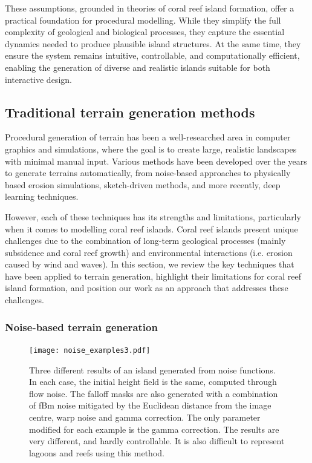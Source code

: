 These assumptions, grounded in theories of coral reef island formation, offer a practical foundation for procedural modelling. While they simplify the full complexity of geological and biological processes, they capture the essential dynamics needed to produce plausible island structures. At the same time, they ensure the system remains intuitive, controllable, and computationally efficient, enabling the generation of diverse and realistic islands suitable for both interactive design.





\subsection{Traditional terrain generation methods}
\label{sec:coral-island-sota-traditional}

Procedural generation of terrain has been a well-researched area in computer graphics and simulations, where the goal is to create large, realistic landscapes with minimal manual input. Various methods have been developed over the years to generate terrains automatically, from noise-based approaches to physically based erosion simulations, sketch-driven methods, and more recently, deep learning techniques.

However, each of these techniques has its strengths and limitations, particularly when it comes to modelling coral reef islands. Coral reef islands present unique challenges due to the combination of long-term geological processes (mainly subsidence and coral reef growth) and environmental interactions (i.e. erosion caused by wind and waves). In this section, we review the key techniques that have been applied to terrain generation, highlight their limitations for coral reef island formation, and position our work as an approach that addresses these challenges.

\subsubsection{Noise-based terrain generation}

\begin{figure}[ht]
    \centering
    \texttt{[image: noise\_examples3.pdf]}
    \caption{Three different results of an island generated from noise functions. In each case, the initial height field is the same, computed through flow noise. The falloff masks are also generated with a combination of fBm noise mitigated by the Euclidean distance from the image centre, warp noise and gamma correction. The only parameter modified for each example is the gamma correction. The results are very different, and hardly controllable. It is also difficult to represent lagoons and reefs using this method.}
    \label{fig:coral-island-noise-example}
\end{figure}

